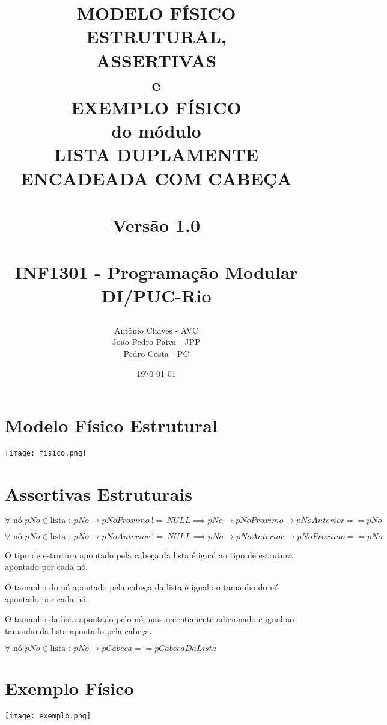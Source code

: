 \documentclass[a4paper,12pt,oneside]{book}
\title{
  \begin{flushright}
  \Huge{MODELO FÍSICO ESTRUTURAL,}\\
  ASSERTIVAS\\
  e\\
  EXEMPLO FÍSICO\\
  do módulo\\
  LISTA DUPLAMENTE\\
  ENCADEADA COM CABEÇA\\
  ~\\
  \LARGE{Versão 1.0}\\
  ~\\
  INF1301 - Programação Modular\\ DI/PUC-Rio
  \end{flushright}
}
\author{Antônio Chaves - AVC\\João Pedro Paiva - JPP\\Pedro Costa - PC}
\date{\today}
\begin{document}
\frontmatter
\maketitle

\tableofcontents



\mainmatter

\chapter{Modelo Físico Estrutural}

\begin{center}

    \texttt{[image: fisico.png]}

\end{center}

\chapter{Assertivas Estruturais}\setlength{\parskip}{1\baselineskip}

\sloppy$\forall \textrm{ nó } pNo \in \textrm{lista : } pNo \rightarrow pNoProximo \ != \ NULL \implies pNo \rightarrow pNoProximo \rightarrow pNoAnterior == pNo$

\noindent\sloppy$\forall \textrm{ nó } pNo \in \textrm{lista : } pNo \rightarrow pNoAnterior \ != \ NULL \implies pNo \rightarrow pNoAnterior \rightarrow pNoProximo == pNo$

\noindent O tipo de estrutura apontado pela cabeça da lista é igual ao tipo de estrutura apontado por cada nó.

\noindent O tamanho do nó apontado pela cabeça da lista é igual ao tamanho do nó apontado por cada nó.

\noindent O tamanho da lista apontado pelo nó mais recentemente adicionado é igual ao tamanho da lista apontado pela cabeça.


\noindent\sloppy$\forall \textrm{ nó } pNo \in \textrm{lista : } pNo \rightarrow pCabeca == pCabecaDaLista$

\setlength{\parskip}{1pt}
\chapter{Exemplo Físico}

\begin{center}

    \texttt{[image: exemplo.png]}

\end{center}

% 
% 
% 
% 
% 
% 
% 
\end{document}
